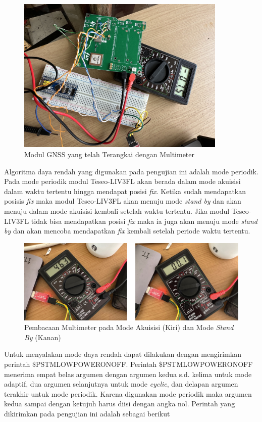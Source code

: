 \begin{figure}[H]
	\centering
	\includegraphics[width=10cm]{contents/chapter-4/low-power.jpg}
	\caption{Modul GNSS yang telah Terangkai dengan Multimeter}
	\label{Fig: low-power-connected}
\end{figure}

Algoritma daya rendah yang digunakan pada pengujian ini adalah mode periodik. Pada mode periodik modul Teseo-LIV3FL akan berada dalam mode akuisisi dalam waktu tertentu hingga mendapat posisi \textit{fix}. Ketika sudah mendapatkan posisis \textit{fix} maka modul Teseo-LIV3FL akan menuju mode \textit{stand by} dan akan menuju dalam mode akuisisi kembali setelah waktu tertentu. Jika modul Teseo-LIV3FL tidak bisa mendapatkan posisi \textit{fix} maka ia juga akan menuju mode \textit{stand by} dan akan mencoba mendapatkan \textit{fix} kembali setelah periode waktu tertentu.

\begin{figure}[H]
	\centering
	\captionsetup{justification=centering}
	\includegraphics[width=14cm]{contents/chapter-4/low-power-result.jpg}
	\caption{Pembacaan Multimeter pada Mode Akuisisi (Kiri) dan Mode \textit{Stand By} (Kanan)}
	\label{Fig: low-power-result}
\end{figure}

Untuk menyalakan mode daya rendah dapat dilakukan dengan mengirimkan perintah \$PSTMLOWPOWERONOFF. Perintah \$PSTMLOWPOWERONOFF menerima empat belas argumen dengan argumen kedua s.d. kelima untuk mode adaptif, dua argumen selanjutnya untuk mode \textit{cyclic}, dan delapan argumen terakhir untuk mode periodik. Karena digunakan mode periodik maka argumen kedua sampai dengan ketujuh harus diisi dengan angka nol. Perintah yang dikirimkan pada pengujian ini adalah sebagai berikut

